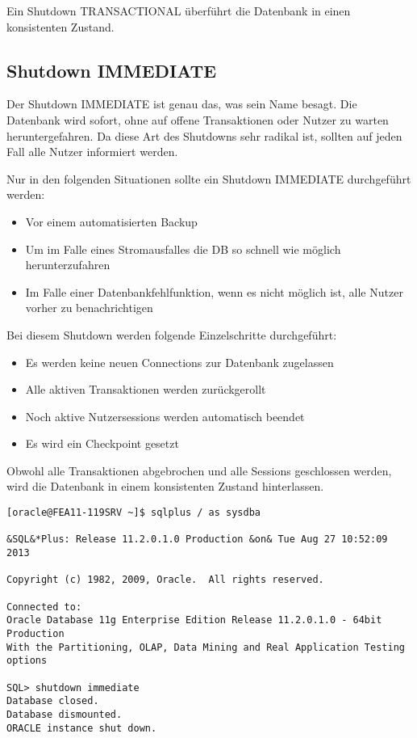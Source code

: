        \begin{merke}
        Ein Shutdown TRANSACTIONAL überführt die Datenbank in einen konsistenten Zustand.
       \end{merke}
      \subsection{Shutdown IMMEDIATE}
        Der Shutdown IMMEDIATE ist genau das, was sein Name besagt. Die Datenbank wird sofort, ohne auf offene Transaktionen oder Nutzer zu warten heruntergefahren. Da diese Art des Shutdowns sehr radikal ist, sollten auf jeden Fall alle Nutzer informiert werden.

        Nur in den folgenden Situationen sollte ein Shutdown IMMEDIATE durchgeführt werden:
        \begin{itemize}
          \item Vor einem automatisierten Backup
          \item Um im Falle eines Stromausfalles die DB so schnell wie möglich herunterzufahren
          \item Im Falle einer Datenbankfehlfunktion, wenn es nicht möglich ist, alle Nutzer vorher zu benachrichtigen
        \end{itemize}
        Bei diesem Shutdown werden folgende Einzelschritte durchgeführt:
        \begin{itemize}
          \item Es werden keine neuen Connections zur Datenbank zugelassen
          \item Alle aktiven Transaktionen werden zurückgerollt
          \item Noch aktive Nutzersessions werden automatisch beendet
          \item Es wird ein Checkpoint gesetzt
        \end{itemize}
    
        \begin{merke}
          Obwohl alle Transaktionen abgebrochen und alle Sessions geschlossen werden, wird die Datenbank in einem konsistenten Zustand hinterlassen.
        \end{merke}
        \begin{lstlisting}[caption={Durchführen eines Shutdown IMMEDIATE},label=admin12,language=sqlplus]
[oracle@FEA11-119SRV ~]$ sqlplus / as sysdba

&SQL&*Plus: Release 11.2.0.1.0 Production &on& Tue Aug 27 10:52:09 2013

Copyright (c) 1982, 2009, Oracle.  All rights reserved.

Connected to:
Oracle Database 11g Enterprise Edition Release 11.2.0.1.0 - 64bit Production
With the Partitioning, OLAP, Data Mining and Real Application Testing options

SQL> shutdown immediate
Database closed.
Database dismounted.
ORACLE instance shut down.
        \end{lstlisting}
